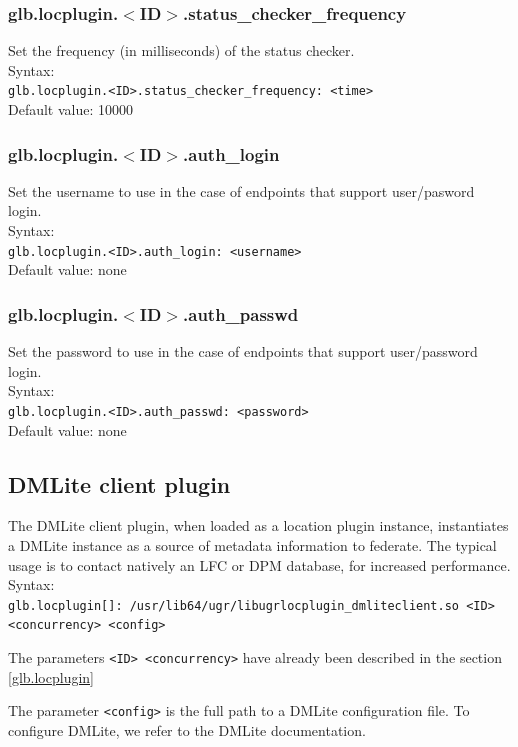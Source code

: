 \documentclass[12pt]{article} %
\begin{document}
\subsubsection{glb.locplugin.$<$ID$>$.status\_checker\_frequency}
Set the frequency (in milliseconds) of the status checker.\\
Syntax:\\
\verb"glb.locplugin.<ID>.status_checker_frequency: <time>"\\
Default value: 10000\\
\subsubsection{glb.locplugin.$<$ID$>$.auth\_login}
Set the username to use in the case of endpoints that support user/pasword login.\\
Syntax:\\
\verb"glb.locplugin.<ID>.auth_login: <username>"\\
Default value: none\\
\subsubsection{glb.locplugin.$<$ID$>$.auth\_passwd}
Set the password to use in the case of endpoints that support user/password login.\\
Syntax:\\
\verb"glb.locplugin.<ID>.auth_passwd: <password>"\\
Default value: none\\



\subsection{DMLite client plugin}

The DMLite client plugin, when loaded as a location plugin instance, instantiates a DMLite instance as a source of metadata information to federate. The typical usage is to contact natively an LFC or DPM database, for increased performance.\\

Syntax:\\
\verb"glb.locplugin[]: /usr/lib64/ugr/libugrlocplugin_dmliteclient.so <ID> <concurrency> <config>"

The parameters \verb"<ID> <concurrency>" have already been described in the section \ref{glb.locplugin}

The parameter \verb"<config>" is the full path to a DMLite configuration file. To configure DMLite, we refer to the DMLite documentation.
\end{document}
